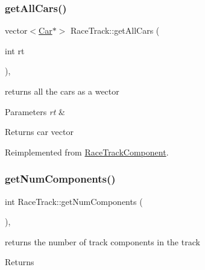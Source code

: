 \mbox{\label{class_race_track_abc68bb4172e9db6ebe3dbfb584691512}} 
\subsubsection{\texorpdfstring{get\+All\+Cars()}{getAllCars()}}
{\footnotesize\ttfamily vector$<$\mbox{\hyperlink{class_car}{Car}}$\ast$$>$ Race\+Track\+::get\+All\+Cars (\begin{DoxyParamCaption}\item[{int}]{rt }\end{DoxyParamCaption})\hspace{0.3cm}{\ttfamily [inline]}, {\ttfamily [virtual]}}

returns all the cars as a wector 
\begin{DoxyParams}{Parameters}
{\em rt} & \\
\hline
\end{DoxyParams}
\begin{DoxyReturn}{Returns}
car vector 
\end{DoxyReturn}


Reimplemented from \mbox{\hyperlink{class_race_track_component_a3a2453934d3795376c23e251b2d3f99d}{Race\+Track\+Component}}.

\mbox{\label{class_race_track_a8870f6bafe0fbb3e693405b23dd40016}} 
\subsubsection{\texorpdfstring{get\+Num\+Components()}{getNumComponents()}}
{\footnotesize\ttfamily int Race\+Track\+::get\+Num\+Components (\begin{DoxyParamCaption}{ }\end{DoxyParamCaption})\hspace{0.3cm}{\ttfamily [inline]}, {\ttfamily [virtual]}}

returns the number of track components in the track \begin{DoxyReturn}{Returns}

\end{DoxyReturn}


